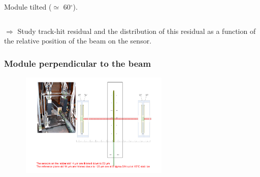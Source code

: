 \documentclass{beamer}
\newcommand{\grille}{
    \begin{tikzpicture}[overlay,remember picture]
        \begin{scope}[shift={(current page.south west)}]
            \draw[gray!50] (0,0) grid[step=2mm] (current page.north east);
            \draw[red!50] (0,0) grid[step=1cm] (current page.north east);
            \draw (0.2,1) node {1};
            \draw (0.2,2) node {2};
            \draw (0.2,3) node {3};
            \draw (0.2,4) node {4};
            \draw (0.2,5) node {5};
            \draw (0.2,6) node {6};
            \draw (0.2,7) node {7};
            \draw (0.2,8) node {8};
            \draw (0.2,9) node {9};
            \draw (1,0.5) node {1};
            \draw (2,0.5) node {2};
            \draw (3,0.5) node {3};
            \draw (4,0.5) node {4};
            \draw (5,0.5) node {5};
            \draw (6,0.5) node {6};
            \draw (7,0.5) node {7};
            \draw (8,0.5) node {8};
            \draw (9,0.5) node {9};
            \draw (10,0.5) node {10};
            \draw (11,0.5) node {11};
            \draw (12,0.5) node {12};
        \end{scope}
    \end{tikzpicture}
}
\newcommand{\degres}{\ensuremath{^\circ}}
\begin{document}
\begin{frame}
\begin{columns}[t]
\begin{column}{4cm}
\begin{center}
          \footnotesize{Module tilted ($\simeq$ 60\degres).}
        \end{center}
      \end{column}
    \end{columns}

    \vspace{0.1cm}
    \footnotesize{$\Rightarrow$ Study track-hit residual and the distribution of this residual as a function of the relative position of the beam on the sensor.

    \vspace{0.1cm}
    }
\end{frame}

\begin{frame}
  \frametitle{Module perpendicular to the beam}

  \begin{center}
    \includegraphics[width = 0.7\textwidth, height = 5cm]{Pictures/tb_cern_11_sketch_normal.pdf}
  \end{center}
\end{frame}
\end{document}
